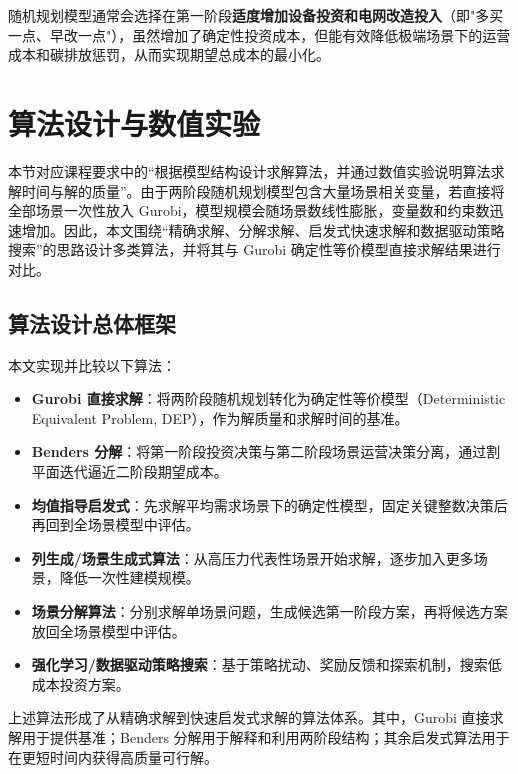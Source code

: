 \documentclass[12pt,a4paper]{article}
\newcommand{\手批注}[2]{\textcolor{#1}{\text{\kaishu #2}}}
\newcommand{\一阶段}{\textcolor{firststage}{\text{\kaishu （一阶段）}}}
\newcommand{\二阶段}{\textcolor{secondstage}{\text{\kaishu （二阶段）}}}
\begin{document}
随机规划模型通常会选择在第一阶段\textbf{适度增加设备投资和电网改造投入}（即"多买一点、早改一点"），虽然增加了确定性投资成本，但能有效降低极端场景下的运营成本和碳排放惩罚，从而实现期望总成本的最小化。

\newpage


\section{算法设计与数值实验}


本节对应课程要求中的“根据模型结构设计求解算法，并通过数值实验说明算法求解时间与解的质量”。由于两阶段随机规划模型包含大量场景相关变量，若直接将全部场景一次性放入 Gurobi，模型规模会随场景数线性膨胀，变量数和约束数迅速增加。因此，本文围绕“精确求解、分解求解、启发式快速求解和数据驱动策略搜索”的思路设计多类算法，并将其与 Gurobi 确定性等价模型直接求解结果进行对比。

\subsection{算法设计总体框架}

本文实现并比较以下算法：
\begin{itemize}[itemsep=0.2em,leftmargin=2em]
    \item \textbf{Gurobi 直接求解}：将两阶段随机规划转化为确定性等价模型（Deterministic Equivalent Problem, DEP），作为解质量和求解时间的基准。
    \item \textbf{Benders 分解}：将第一阶段投资决策与第二阶段场景运营决策分离，通过割平面迭代逼近二阶段期望成本。
    \item \textbf{均值指导启发式}：先求解平均需求场景下的确定性模型，固定关键整数决策后再回到全场景模型中评估。
    \item \textbf{列生成/场景生成式算法}：从高压力代表性场景开始求解，逐步加入更多场景，降低一次性建模规模。
    \item \textbf{场景分解算法}：分别求解单场景问题，生成候选第一阶段方案，再将候选方案放回全场景模型中评估。
    \item \textbf{强化学习/数据驱动策略搜索}：基于策略扰动、奖励反馈和探索机制，搜索低成本投资方案。
\end{itemize}

上述算法形成了从精确求解到快速启发式求解的算法体系。其中，Gurobi 直接求解用于提供基准；Benders 分解用于解释和利用两阶段结构；其余启发式算法用于在更短时间内获得高质量可行解。
\end{document}
